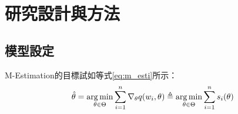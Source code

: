 
\chapter{研究設計與方法}

\section{模型設定}

M-Estimation的目標試如等式\eqref{eq:m_esti}所示：
\begin{equation}
\label{eq:m_esti}
\hat{\theta} = \operatorname*{arg\,min}_{\theta \in \Theta} \sum_{i = 1}^n \nabla_{\theta} q (w_i, \theta) \triangleq \operatorname*{arg\,min}_{\theta \in \Theta} \sum_{i = 1}^n s_i(\theta)
\end{equation}


